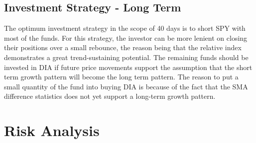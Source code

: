 \documentclass{article}
\begin{document}
\subsection{Investment Strategy - Long Term}
The optimum investment strategy in the scope of 40 days is to short SPY with most of the funds. For this strategy, the investor can be more lenient on closing their positions over a small rebounce, the reason being that the relative index demonstrates a great trend-sustaining potential. The remaining funds should be invested in DIA if future price movements support the assumption that the short term growth pattern will become the long term pattern. The reason to put a small quantity of the fund into buying DIA is because of the fact that the SMA difference statistics does not yet support a long-term growth pattern.


\section{Risk Analysis}

\end{document}
